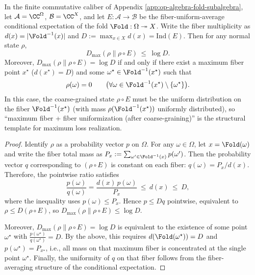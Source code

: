 \begin{corollary}\label{cor:op-algebra-commutative-dmax-extremizers-maxfiber}
In the finite commutative caliber of Appendix \ref{app:op-algebra-fold-subalgebra}, let \(\mathcal{A}=\CC^{\Omega}\), \(\mathcal{B}=\CC^{X}\), and let \(E:\mathcal{A}\to\mathcal{B}\) be the fiber-uniform-average conditional expectation of the fold \(\Fold:\Omega\twoheadrightarrow X\).
Write the fiber multiplicity as \(d(x)=|\Fold^{-1}(x)|\) and \(D:=\max_{x\in X}d(x)=\mathrm{Ind}(E)\).
Then for any normal state \(\rho\),
\[
D_{\max}(\rho\|\rho\!\circ\!E)\ \le\ \log D.
\]
Moreover, \(D_{\max}(\rho\|\rho\!\circ\!E)=\log D\) if and only if there exist a maximum fiber point \(x^\star\) (\(d(x^\star)=D\)) and some \(\omega^\star\in\Fold^{-1}(x^\star)\) such that
\[
\rho(\omega)=0\qquad\bigl(\forall \omega\in\Fold^{-1}(x^\star)\setminus\{\omega^\star\}\bigr).
\]
In this case, the coarse-grained state \(\rho\!\circ\!E\) must be the uniform distribution on the fiber \(\Fold^{-1}(x^\star)\) (with mass \(\rho(\Fold^{-1}(x^\star))\) uniformly distributed), so ``maximum fiber + fiber uniformization (after coarse-graining)'' is the structural template for maximum loss realization.
\end{corollary}
\begin{proof}
Identify \(\rho\) as a probability vector \(p\) on \(\Omega\).
For any \(\omega\in\Omega\), let \(x=\Fold(\omega)\) and write the fiber total mass as \(P_x:=\sum_{\omega'\in\Fold^{-1}(x)}p(\omega')\).
Then the probability vector \(q\) corresponding to \((\rho\!\circ\!E)\) is constant on each fiber:
\(
q(\omega)=P_x/d(x)
\).
Therefore, the pointwise ratio satisfies
\[
\frac{p(\omega)}{q(\omega)}=\frac{d(x)\,p(\omega)}{P_x}\ \le\ d(x)\ \le\ D,
\]
where the inequality uses \(p(\omega)\le P_x\).
Hence \(p\le Dq\) pointwise, equivalent to \(\rho\le D(\rho\!\circ\!E)\), so
\(
D_{\max}(\rho\|\rho\!\circ\!E)\le \log D
\).
\par
Moreover, \(D_{\max}(\rho\|\rho\!\circ\!E)=\log D\) is equivalent to the existence of some point \(\omega^\star\) with \(\frac{p(\omega^\star)}{q(\omega^\star)}=D\).
By the above, this requires \(d(\Fold(\omega^\star))=D\) and \(p(\omega^\star)=P_{x^\star}\), i.e., all mass on that maximum fiber is concentrated at the single point \(\omega^\star\).
Finally, the uniformity of \(q\) on that fiber follows from the fiber-averaging structure of the conditional expectation. \qedhere
\end{proof}

